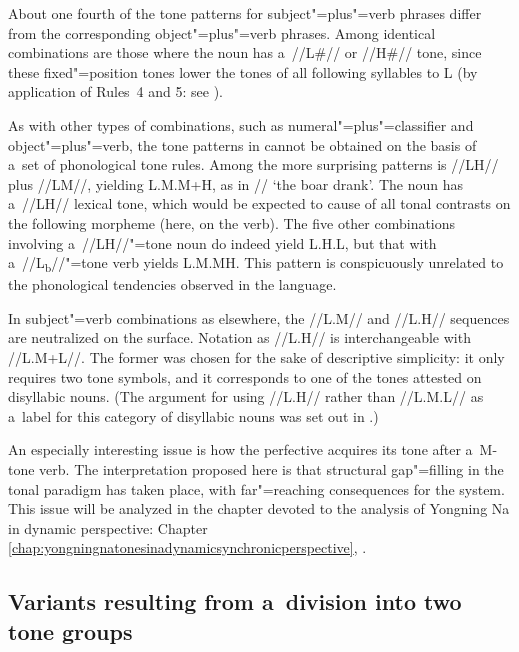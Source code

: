 About one fourth of the tone patterns for subject"=plus"=verb phrases differ from the corresponding
object"=plus"=verb phrases. Among identical combinations are those where the noun has a~//L\#// or \mbox{//H\#//}
tone, since these fixed"=position tones lower the tones of all following syllables to L (by application of Rules~4 and 5: see ).

As with other types of combinations, such as numeral"=plus"=classifier and object"=plus"=verb, the tone
patterns in  cannot be obtained on the basis of a~set of phonological tone rules. Among the more
surprising patterns is \mbox{//LH//} plus \mbox{//LM//}, yielding L.M.M+H, as in // ‘the boar drank’. The noun has a~\mbox{//LH//} lexical
tone, which would be expected to cause  of all tonal contrasts on the following morpheme (here, on the verb). The five
other combinations involving a~\mbox{//LH//}"=tone noun do indeed yield L.H.L, but that with a~//L\textsubscript{b}//"=tone verb yields L.M.MH. This pattern
is conspicuously unrelated to the phonological tendencies observed in the language.

In subject"=verb combinations as elsewhere, the //L.M// and //L.H// sequences are neutralized on the
surface. Notation as //L.H// is interchangeable with //L.M+L//. The former was chosen for the sake of
descriptive simplicity: it only requires two tone symbols, and it corresponds to one of the tones
attested on disyllabic nouns. (The argument for using //L.H// rather  than //L.M.L// as a~label for this category of disyllabic nouns was set out in .)

An especially interesting issue is how the {perfective} acquires its tone after a~M-tone verb. The interpretation proposed here is that structural gap"=filling in the tonal paradigm has taken place, with far"=reaching consequences for the system. This issue will be analyzed in the chapter devoted to the analysis of Yongning Na in dynamic perspective: Chapter \ref{chap:yongningnatonesinadynamicsynchronicperspective}, . 


\subsection{Variants resulting from a~division into two tone groups}
\label{sec:variantsresultingfromadivisionintotwotonegroups}


